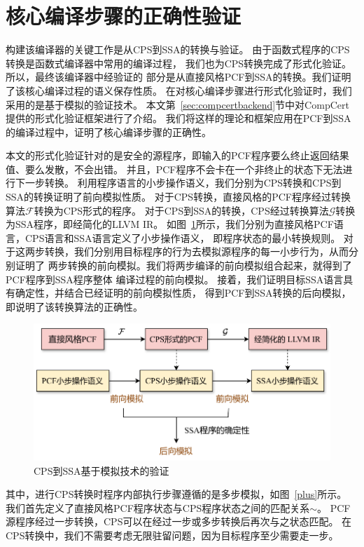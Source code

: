 \section{核心编译步骤的正确性验证}

构建该编译器的关键工作是从CPS到SSA的转换与验证。
由于函数式程序的CPS转换是函数式编译器中常用的编译过程，
我们也为CPS转换完成了形式化验证。所以，最终该编译器中经验证的
部分是从直接风格PCF到SSA的转换。我们证明了该核心编译过程的语义保存性质。
在对核心编译步骤进行形式化验证时，我们采用的是基于模拟的验证技术。
本文第~\ref{sec:compcertbackend}节中对CompCert提供的形式化验证框架进行了介绍。
我们将这样的理论和框架应用在PCF到SSA的编译过程中，证明了核心编译步骤的正确性。

本文的形式化验证针对的是安全的源程序，即输入的PCF程序要么终止返回结果值、要么发散，不会出错。
并且，PCF程序不会卡在一个非终止的状态下无法进行下一步转换。
利用程序语言的小步操作语义，我们分别为CPS转换和CPS到SSA的转换证明了前向模拟性质。
对于CPS转换，直接风格的PCF程序经过转换算法$\mathcal{F}$转换为CPS形式的程序。
对于CPS到SSA的转换，CPS经过转换算法$\mathcal{G}$转换为SSA程序，即经简化的LLVM IR。
如图~\ref{extracts}所示，我们分别为直接风格PCF语言，CPS语言和SSA语言定义了小步操作语义，
即程序状态的最小转换规则。
对于这两步转换，我们分别用目标程序的行为去模拟源程序的每一小步行为，从而分别证明了
两步转换的前向模拟。我们将两步编译的前向模拟组合起来，就得到了PCF程序到SSA程序整体
编译过程的前向模拟。
接着，我们证明目标SSA语言具有确定性，并结合已经证明的前向模拟性质，
得到PCF到SSA转换的后向模拟，即说明了该转换算法的正确性。

\begin{figure}[htbp]
    \centering
    \vspace{2ex}
    \includegraphics[width=0.8\linewidth]{figures/extracts.drawio.pdf}
    \caption{CPS到SSA基于模拟技术的验证}\label{extracts}
\end{figure}

其中，进行CPS转换时程序内部执行步骤遵循的是多步模拟，如图~\ref{plus}所示。
我们首先定义了直接风格PCF程序状态与CPS程序状态之间的匹配关系$\sim$。
PCF源程序经过一步转换，CPS可以在经过一步或多步转换后再次与之状态匹配。
在CPS转换中，我们不需要考虑无限驻留问题，因为目标程序至少需要走一步。

